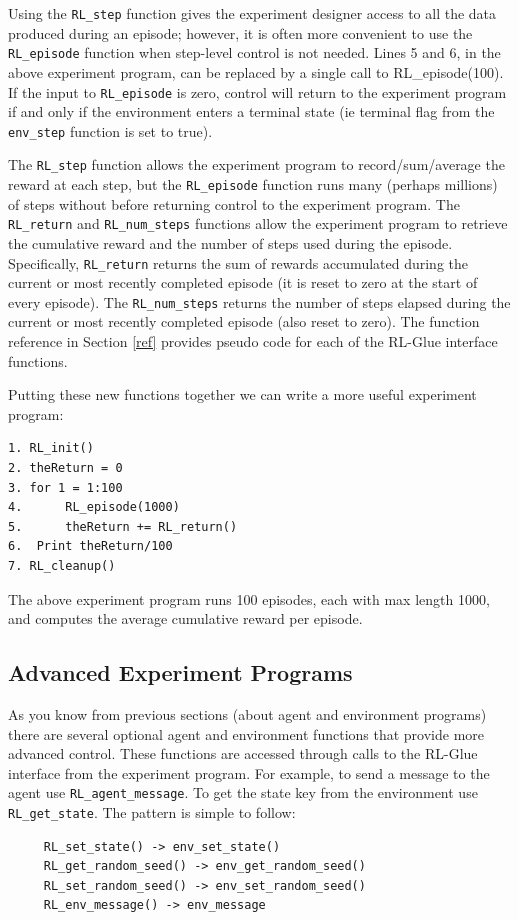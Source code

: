 \documentclass[11pt]{article}
\begin{document}
Using the \texttt{RL\_step} function gives the experiment designer access to all the data produced during an episode; however, it is often more convenient to use the \texttt{RL\_episode} function when step-level control is not needed. Lines 5 and 6, in the above experiment program, can be replaced by a single call to RL\_episode(100). If the input to \texttt{RL\_episode} is zero, control will return to the experiment program if and only if the environment enters a terminal state (ie terminal flag from the \texttt{env\_step} function is set to true).

The \texttt{RL\_step} function allows the experiment program to record/sum/average the reward at each step, but the \texttt{RL\_episode} function runs many (perhaps millions) of steps without before returning control to the experiment program. The \texttt{RL\_return} and \texttt{RL\_num\_steps} functions allow the experiment program to retrieve the cumulative reward and the number of steps used during the episode. Specifically, \texttt{RL\_return} returns the sum of rewards accumulated during the current or most recently completed episode (it is reset to zero at the start of every episode). The \texttt{RL\_num\_steps} returns the number of steps elapsed during the current or most recently completed episode (also reset to zero). The function reference in Section \ref{ref} provides pseudo code for each of the RL-Glue interface functions.

Putting these new functions together we can write a more useful experiment program:
\begin{verbatim}
1. RL_init()
2. theReturn = 0
3. for 1 = 1:100
4.      RL_episode(1000)
5.      theReturn += RL_return()
6.  Print theReturn/100
7. RL_cleanup()
\end{verbatim}
The above experiment program runs 100 episodes, each with max length 1000, and computes the average cumulative reward per episode.

\subsection{Advanced Experiment Programs}
\label{expp2}


As you know from previous sections (about agent and environment programs) there are several optional agent and environment functions that provide more advanced control. These functions are accessed through calls to the RL-Glue interface from the experiment program. For example, to send a message to the agent use \texttt{RL\_agent\_message}. To get the state key from the environment use \texttt{RL\_get\_state}. The pattern is simple to follow:
\begin{verbatim}
     RL_set_state() -> env_set_state()
     RL_get_random_seed() -> env_get_random_seed()
     RL_set_random_seed() -> env_set_random_seed()
     RL_env_message() -> env_message
\end{verbatim}
\end{document}
